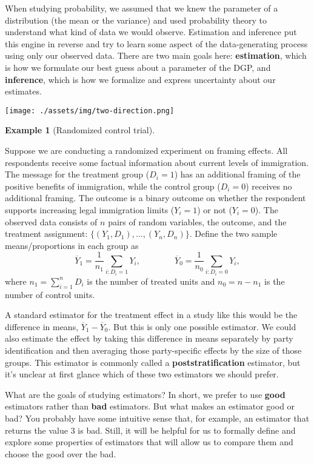 \documentclass[
  letterpaper,
  DIV=11,
  numbers=noendperiod]{scrreprt}
\newcommand{\Ybar}{\overline{Y}}
\theoremstyle{definition}
\theoremstyle{plain}
\theoremstyle{definition}
\newtheorem{example}{Example}[chapter]
\theoremstyle{remark}
\begin{document}
When studying probability, we assumed that we knew the parameter of a
distribution (the mean or the variance) and used probability theory to
understand what kind of data we would observe. Estimation and inference
put this engine in reverse and try to learn some aspect of the
data-generating process using only our observed data. There are two main
goals here: \textbf{estimation}, which is how we formulate our best
guess about a parameter of the DGP, and \textbf{inference}, which is how
we formalize and express uncertainty about our estimates.

\texttt{[image: ./assets/img/two-direction.png]}

\leavevmode{}%
\begin{example}[Randomized control trial]\label{exm-rct}

Suppose we are conducting a randomized experiment on framing effects.
All respondents receive some factual information about current levels of
immigration. The message for the treatment group (\(D_i = 1\)) has an
additional framing of the positive benefits of immigration, while the
control group (\(D_i = 0\)) receives no additional framing. The outcome
is a binary outcome on whether the respondent supports increasing legal
immigration limits (\(Y_i = 1\)) or not (\(Y_i = 0\)). The observed data
consists of \(n\) pairs of random variables, the outcome, and the
treatment assignment: \(\{(Y_1, D_1), \ldots, (Y_n, D_n)\}\). Define the
two sample means/proportions in each group as \[
\Ybar_1 = \frac{1}{n_1} \sum_{i: D_i = 1} Y_i,  \qquad\qquad \Ybar_0 = \frac{1}{n_0} \sum_{i: D_i = 0} Y_i,
\] where \(n_1 = \sum_{i=1}^n D_i\) is the number of treated units and
\(n_0 = n - n_1\) is the number of control units.

A standard estimator for the treatment effect in a study like this would
be the difference in means, \(\Ybar_1 - \Ybar_0\). But this is only one
possible estimator. We could also estimate the effect by taking this
difference in means separately by party identification and then
averaging those party-specific effects by the size of those groups. This
estimator is commonly called a \textbf{poststratification} estimator,
but it's unclear at first glance which of these two estimators we should
prefer.

\end{example}

What are the goals of studying estimators? In short, we prefer to use
\textbf{good} estimators rather than \textbf{bad} estimators. But what
makes an estimator good or bad? You probably have some intuitive sense
that, for example, an estimator that returns the value 3 is bad. Still,
it will be helpful for us to formally define and explore some properties
of estimators that will allow us to compare them and choose the good
over the bad.
\end{document}
